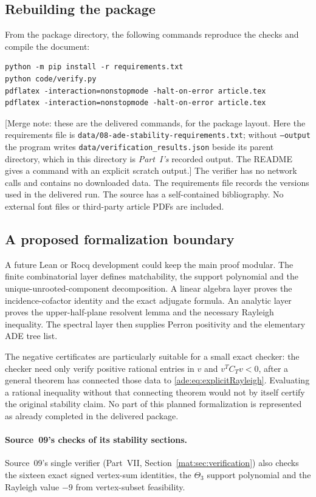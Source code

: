\documentclass[11pt]{article}
\numberwithin{equation}{section}
\theoremstyle{definition}
\begin{document}
\subsection{Rebuilding the package}

From the package directory, the following commands reproduce the checks
and compile the document:
\begin{lstlisting}
python -m pip install -r requirements.txt
python code/verify.py
pdflatex -interaction=nonstopmode -halt-on-error article.tex
pdflatex -interaction=nonstopmode -halt-on-error article.tex
\end{lstlisting}
[Merge note: these are the delivered commands, for the package layout.
Here the requirements file is \nolinkurl{data/08-ade-stability-requirements.txt};
without \texttt{--output} the program writes
\nolinkurl{data/verification_results.json} beside its parent directory, which
in this directory is \emph{Part~I's} recorded output. The README gives a
command with an explicit scratch output.] The verifier has no network calls and contains no downloaded data.  The
requirements file records the versions used in the delivered run.
The source has a self-contained bibliography.  No external font files or
third-party article PDFs are included.

\subsection{A proposed formalization boundary}

A future Lean or Rocq development could keep the main proof modular.
The finite combinatorial layer defines matchability, the support
polynomial and the unique-unrooted-component decomposition.  A linear
algebra layer proves the incidence-cofactor identity and the exact
adjugate formula.  An analytic layer proves the upper-half-plane
resolvent lemma and the necessary Rayleigh inequality.  The spectral
layer then supplies Perron positivity and the elementary ADE tree list.

The negative certificates are particularly suitable for a small exact
checker: the checker need only verify positive rational entries in $v$
and $v^TC_Tv<0$, after a general theorem has connected those data to
\eqref{ade:eq:explicitRayleigh}.  Evaluating a rational inequality without
that connecting theorem would not by itself certify the original
stability claim.  No part of this planned formalization is represented
as already completed in the delivered package.

\paragraph{Source~09's checks of its stability sections.}
Source~09's single verifier (Part~VII, Section~\ref{mat:sec:verification})
also checks the sixteen exact signed vertex-sum identities, the $\Theta_3$
support polynomial and the Rayleigh value $-9$ from vertex-subset
feasibility.
\end{document}
